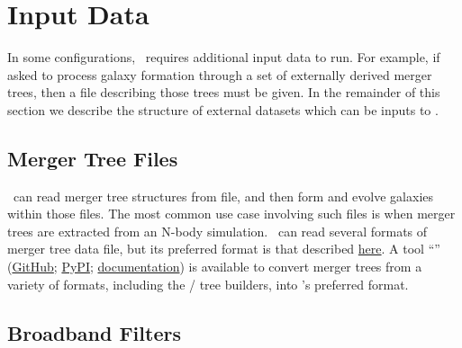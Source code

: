 \chapter{Input Data}

In some configurations, \glc\ requires additional input data to run. For example, if asked to process galaxy formation through a set of externally derived merger trees, then a file describing those trees must be given. In the remainder of this section we describe the structure of external datasets which can be inputs to \glc.

\section{Merger Tree Files}

\glc\ can read merger tree structures from file, and then form and evolve galaxies within those files. The most common use case involving such files is when merger trees are extracted from an N-body simulation. \glc\ can read several formats of merger tree data file, but its preferred format is that described \href{https://github.com/galacticusorg/galacticus/wiki/Merger-Tree-File-Format}{here}. A tool ``'' (\href{https://github.com/galacticusorg/astrosylva}{GitHub}; \href{https://pypi.org/project/astrosylva/}{PyPI}; \href{https://astrosylva.readthedocs.io/en/latest/}{documentation}) is available to convert merger trees from a variety of formats, including the \href{https://bitbucket.org/gfcstanford/rockstar}/\href{https://bitbucket.org/pbehroozi/consistent-trees} tree builders, into \glc's preferred format.

\section{Broadband Filters}

